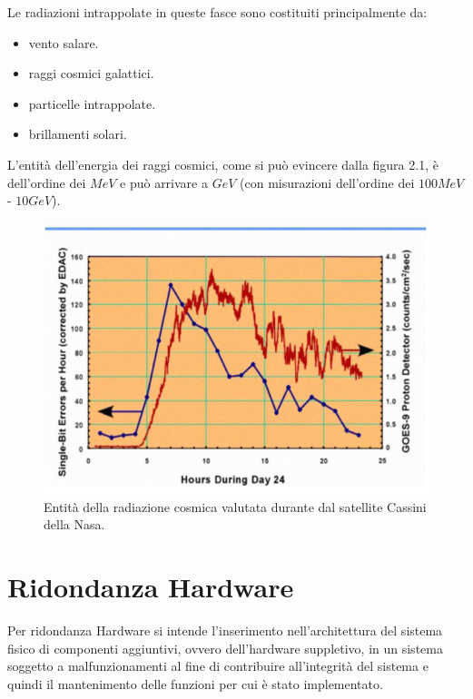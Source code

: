 \documentclass[LaM,binding=0.6cm,oneside]{../sapthesis}
\begin{document}
Le radiazioni intrappolate in queste fasce sono costituiti principalmente da:
\begin{itemize}
    \item vento salare.
    
    \item raggi cosmici galattici.
    
    \item particelle intrappolate.
    
    \item brillamenti solari.
\end{itemize}

L'entità dell'energia dei raggi cosmici, come si può evincere dalla figura 2.1, è dell'ordine dei $MeV$ e può arrivare a $GeV$ (con misurazioni dell'ordine  dei $100 MeV$ - $10GeV$).
    \begin{figure}[htbp]
    \centerline{\includegraphics[scale=.67]{examples/CassiniFlares.PNG}}
    \caption{Entità della radiazione cosmica valutata durante dal satellite Cassini della Nasa.}
    \label{fig}
    \end{figure}
\clearpage
\section{ Ridondanza Hardware }

Per ridondanza Hardware si intende l'inserimento nell'architettura del sistema fisico di componenti aggiuntivi, ovvero dell'hardware suppletivo, in un sistema soggetto a malfunzionamenti al fine di contribuire all'integrità del sistema e quindi il mantenimento delle funzioni per cui è stato implementato.
\end{document}
